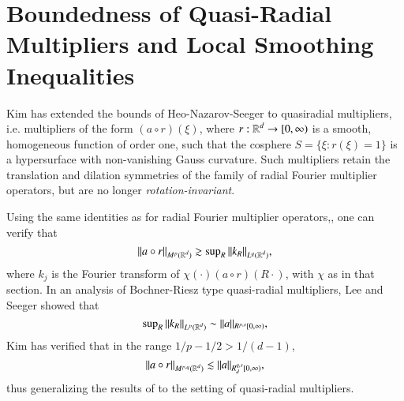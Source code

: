 




\section{Boundedness of Quasi-Radial Multipliers and Local Smoothing Inequalities}

Kim \cite{KimQuasiradial} has extended 
the bounds of Heo-Nazarov-Seeger to quasiradial multipliers, i.e. multipliers of the form $(a \circ r)(\xi)$, where $r: \operatorname{\mathbb{R}}^d \to [0,\infty)$ is a smooth, homogeneous function of order one, such that the cosphere $S = \{ \xi : r(\xi) = 1 \}$ is a hypersurface with non-vanishing Gauss curvature. Such multipliers retain the translation and dilation symmetries of the family of radial Fourier multiplier operators, but are no longer \emph{rotation-invariant}.

Using the same identities as for radial Fourier multiplier operators,, one can verify that
%
\[ \| a \circ r \|_{M^p(\operatorname{\mathbb{R}}^d)} \gtrsim \sup\nolimits_R \| k_R \|_{L^q(\operatorname{\mathbb{R}}^d)}, \]
%
where $k_j$ is the Fourier transform of $\chi(\cdot) (a \circ r)(R \cdot)$, with $\chi$ as in that section. In an analysis of Bochner-Riesz type quasi-radial multipliers, Lee and Seeger \cite{LeeSeeger2} showed that
%
\[ \sup\nolimits_R \| k_R \|_{L^p(\operatorname{\mathbb{R}}^d)} \sim \| a \|_{R^{p,s}[0,\infty)}, \]
%
Kim \cite{KimQuasiradial} has verified that in the range $1/p - 1/2 > 1/(d-1)$,
%
\[ \| a \circ r \|_{M^{p,q}(\operatorname{\mathbb{R}}^d)} \lesssim \| a \|_{R^{q,s}_d[0,\infty)}, \]
%
thus generalizing the results of \cite{HeoandNazarovandSeeger} to the setting of quasi-radial multipliers.

